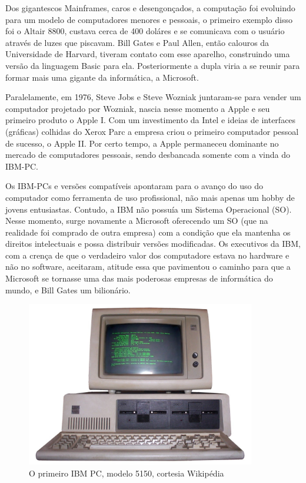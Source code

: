 \documentclass[brazil,times]{abnt}
\begin{document}
Dos gigantescos Mainframes, caros e desengonçados, a computação foi evoluindo
para um modelo de computadores menores e pessoais, o primeiro exemplo disso foi
o Altair 8800, custava cerca de 400 doláres e se comunicava com o usuário
através de luzes que piscavam. Bill Gates e Paul Allen, então calouros da
Universidade de Harvard, tiveram contato com esse aparelho, construindo uma
versão da linguagem Basic para ela. Posteriormente a dupla viria a se reunir
para formar mais uma gigante da informática, a Microsoft.

Paralelamente, em 1976, Steve Jobs e Steve Wozniak juntaram-se para vender um
computador projetado por Wozniak, nascia nesse momento a Apple e seu primeiro
produto o Apple I. Com um investimento da Intel e ideias de interfaces
(gráficas) colhidas do Xerox Parc a empresa criou o primeiro computador pessoal
de sucesso, o Apple II. Por certo tempo, a Apple permaneceu dominante no mercado
de computadores pessoais, sendo desbancada somente com a vinda do IBM-PC.

Os IBM-PCs e versões compatíveis apontaram para o avanço do uso do computador
como ferramenta de uso profissional, não mais apenas um hobby de jovens
entusiastas. Contudo, a IBM não possuía um Sistema Operacional (SO). Nesse
momento, surge novamente a Microsoft oferecendo um SO (que na realidade foi
comprado de outra empresa) com a condição que ela mantenha os direitos
intelectuais e possa distribuir versões modificadas. Os executivos da IBM, com a
crença de que o verdadeiro valor dos computadore estava no hardware e não no
software, aceitaram, atitude essa que pavimentou o caminho para que a Microsoft
se tornasse uma das mais poderosas empresas de informática do mundo, e Bill
Gates um bilionário. \cite{wiki:microsoft}

\begin{figure}[htp]
\begin{center}
  \includegraphics[width=100mm]{imagens/IBM_PC_5150.jpg}
  \caption[O primeiro IBM PC, modelo 5150, cortesia Wikipédia]{O primeiro IBM
  PC, modelo 5150, cortesia Wikipédia}
  \label{fig:ibm-pc}
\end{center}
\end{figure}
\end{document}
